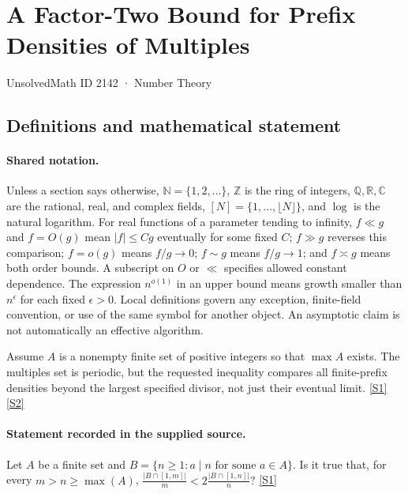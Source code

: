 \documentclass[11pt,a4paper]{article}
\newcommand{\N}{\mathbb{N}}
\newcommand{\Z}{\mathbb{Z}}
\newcommand{\Q}{\mathbb{Q}}
\newcommand{\R}{\mathbb{R}}
\newcommand{\C}{\mathbb{C}}
\newcommand{\sref}[2]{\hyperlink{source:#1:#2}{[S#2]}}
\begin{document}

\setcounter{section}{2141}

\section{A Factor-Two Bound for Prefix Densities of Multiples}\label{2142}

{\small\sffamily UnsolvedMath ID 2142 · Number Theory}

\subsection{Definitions and mathematical statement}

\paragraph{Shared notation.}Unless a section says otherwise, $\N=\{1,2,\ldots\}$,
$\Z$ is the ring of integers, $\Q,\R,\C$ are the rational, real, and complex
fields, $[N]=\{1,\ldots,\lfloor N\rfloor\}$, and $\log$ is the natural
logarithm. For real functions of a parameter tending to infinity,
$f\ll g$ and $f=O(g)$ mean $|f|\leq Cg$ eventually for some fixed $C$;
$f\gg g$ reverses this comparison; $f=o(g)$ means $f/g\to0$;
$f\sim g$ means $f/g\to1$; and $f\asymp g$ means both order bounds.
A subscript on $O$ or $\ll$ specifies allowed constant dependence.
The expression $n^{o(1)}$ in an upper bound means growth smaller than
$n^\epsilon$ for each fixed $\epsilon>0$. Local definitions govern any
exception, finite-field convention, or use of the same symbol for another
object. An asymptotic claim is not automatically an effective algorithm.



Assume $A$ is a nonempty finite set of positive integers so that $\max A$ exists. The multiples set is periodic, but the requested inequality compares all finite-prefix densities beyond the largest specified divisor, not just their eventual limit. \sref{2142}{1} \sref{2142}{2}

\paragraph{Statement recorded in the supplied source.}
Let $A$ be a finite set and $ B=\{ n \geq 1 : a\mid n\textrm{ for some }a\in A\}. $ Is it true that, for every $m>n\geq \max(A)$, $ \frac{\lvert B\cap [1,m]\rvert }{m}< 2\frac{\lvert B\cap [1,n]\rvert}{n}? $ \sref{2142}{1}
\end{document}
